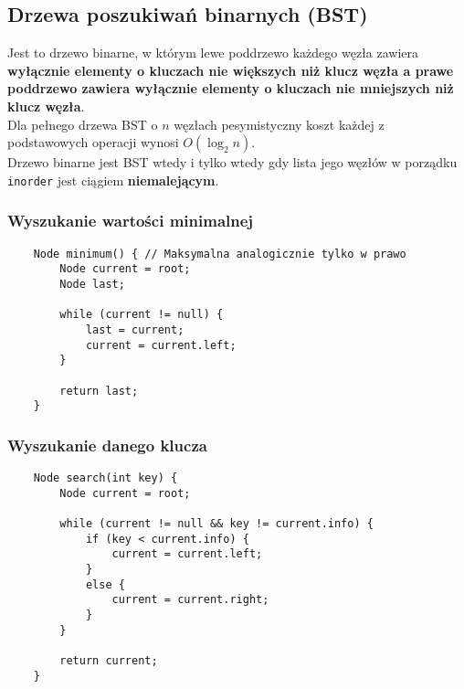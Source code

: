 \documentclass[algorytmy.tex]{subfiles}
\begin{document}
\subsection{Drzewa poszukiwań binarnych (BST)}

Jest to drzewo binarne, w którym lewe poddrzewo każdego węzła zawiera
\textbf{wyłącznie elementy o kluczach nie większych niż klucz węzła a prawe
poddrzewo zawiera wyłącznie elementy o kluczach nie mniejszych niż klucz węzła}.\\

Dla pełnego drzewa BST o $n$ węzłach pesymistyczny koszt każdej z podstawowych
operacji wynosi $O(\log_2 n)$.\\

Drzewo binarne jest BST wtedy i tylko wtedy gdy lista jego węzłów w porządku
\texttt{inorder} jest ciągiem \textbf{niemalejącym}.\\

\subsubsection{Wyszukanie wartości minimalnej}

\begin{verbatim}
    Node minimum() { // Maksymalna analogicznie tylko w prawo
        Node current = root;
        Node last;

        while (current != null) {
            last = current;
            current = current.left;
        }

        return last;
    }
\end{verbatim}

\subsubsection{Wyszukanie danego klucza}

\begin{verbatim}
    Node search(int key) {
        Node current = root;

        while (current != null && key != current.info) {
            if (key < current.info) {
                current = current.left;
            }
            else {
                current = current.right;
            }
        }

        return current;
    }
\end{verbatim}
\end{document}
